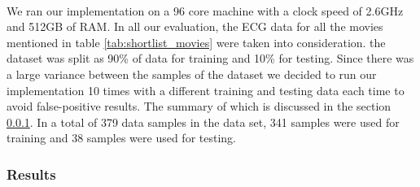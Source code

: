 \paragraph{} We ran our implementation on a 96 core machine with a clock speed of 2.6GHz and 512GB of RAM. In all our evaluation, the ECG data for all the movies mentioned in table \ref{tab:shortlist_movies} were taken into consideration. the dataset was split as 90\% of data for training and 10\% for testing. Since there was a large variance between the samples of the dataset we decided to run our implementation 10 times with a different training and testing data each time to avoid false-positive results. The summary of which is discussed in the section \ref{sec:ecg_analysis_results}. In a total of 379 data samples in the data set, 341 samples were used for training and 38 samples were used for testing. 

\subsubsection{Results}
\label{sec:ecg_analysis_results}
